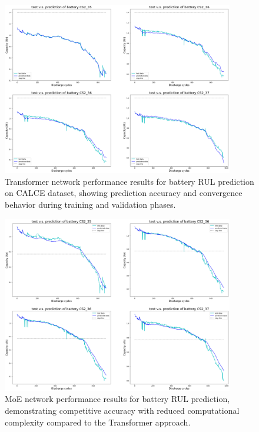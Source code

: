 \begin{figure}[htbp]
    \centering
    \includegraphics[width=0.9\textwidth]{imgs/transf_graph_results.png}
    \caption{Transformer network performance results for battery RUL prediction on CALCE dataset, showing prediction accuracy and convergence behavior during training and validation phases.}
    \label{fig:transformer_results}
\end{figure}


\begin{figure}[htbp]
    \centering
    \includegraphics[width=0.9\textwidth]{imgs/moe_graph_results.png}
    \caption{MoE network performance results for battery RUL prediction, demonstrating competitive accuracy with reduced computational complexity compared to the Transformer approach.}
    \label{fig:moe_results}
\end{figure}

